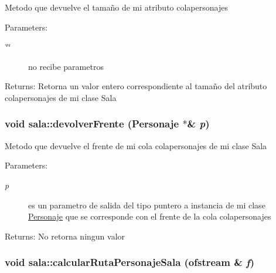 Metodo que devuelve el tamaño de mi atributo colapersonajes \begin{Desc}
\item[Parameters:]
\begin{description}
\item[{\em \char`\"{}\char`\"{}}]no recibe parametros \end{description}
\end{Desc}
\begin{Desc}
\item[Returns:]Retorna un valor entero correspondiente al tamaño del atributo colapersonajes de mi clase Sala \end{Desc}
\hypertarget{classsala_3717b76f3e6c98efd83fda02da5a1a06}{
\subsubsection[devolverFrente]{\setlength{\rightskip}{0pt plus 5cm}void sala::devolverFrente ({\bf Personaje} $\ast$\& {\em p})}}
\label{classsala_3717b76f3e6c98efd83fda02da5a1a06}


Metodo que devuelve el frente de mi cola colapersonajes de mi clase Sala \begin{Desc}
\item[Parameters:]
\begin{description}
\item[{\em p}]es un parametro de salida del tipo puntero a instancia de mi clase \hyperlink{classPersonaje}{Personaje} que se corresponde con el frente de la cola colapersonajes \end{description}
\end{Desc}
\begin{Desc}
\item[Returns:]No retorna ningun valor \end{Desc}
\hypertarget{classsala_0c2411487cc9256b0ce9acfff8d48ded}{
\subsubsection[calcularRutaPersonajeSala]{\setlength{\rightskip}{0pt plus 5cm}void sala::calcularRutaPersonajeSala (ofstream \& {\em f})}}
\label{classsala_0c2411487cc9256b0ce9acfff8d48ded}



